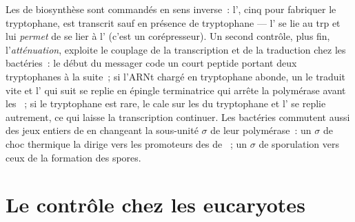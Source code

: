 \begin{proposition}\label{prop:b1:expression-control:trp}
Les  de biosynthèse sont commandés en sens inverse~: l'\emph{}, cinq  pour fabriquer le tryptophane, est transcrit
sauf en présence de tryptophane --- l' se lie au 
trp et lui \emph{permet} de se lier à l' (c'est un
corépresseur). Un second contrôle, plus fin, l'\emph{atténuation},
exploite le couplage de la transcription et de la traduction chez les
bactéries~: le début du messager code un court peptide portant deux
tryptophanes à la suite~; si l'ARNt chargé en tryptophane abonde, un
 le traduit vite et l' qui suit se replie en épingle
terminatrice qui arrête la polymérase avant les ~; si le
tryptophane est rare, le  cale sur les  du tryptophane et
l' se replie autrement, ce qui laisse la transcription continuer. Les
bactéries commutent aussi des jeux entiers de  en changeant la
sous-unité $\sigma$ de leur polymérase~: un $\sigma$ de choc thermique
la dirige vers les promoteurs des  de ~; un $\sigma$ de
sporulation vers ceux de la formation des spores.
\end{proposition}

\section{Le contrôle chez les eucaryotes}

